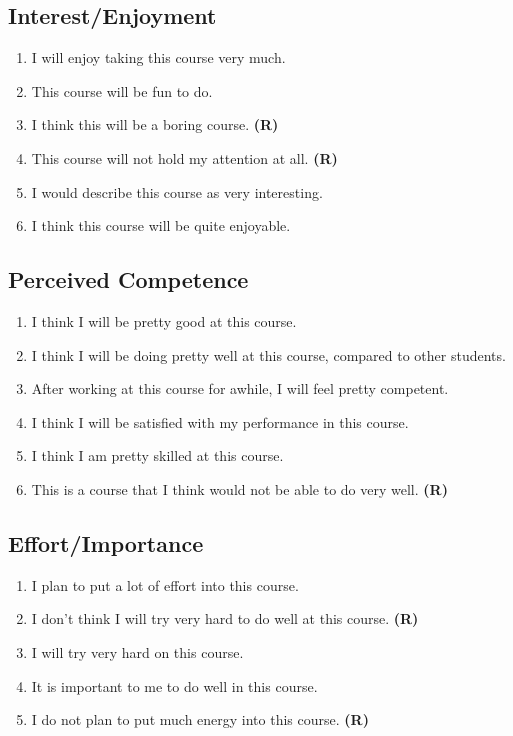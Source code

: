 \documentclass[letterpaper, nobind]{templates/ociamthesis}
\providecommand{\tightlist}{%
  \setlength{\itemsep}{0pt}\setlength{\parskip}{0pt}}
\begin{document}
\hypertarget{interestenjoyment}{%
\subsection{Interest/Enjoyment}\label{interestenjoyment}}

\begin{enumerate}
\def\labelenumi{\arabic{enumi}.}
\tightlist
\item
  I will enjoy taking this course very much.
\item
  This course will be fun to do.
\item
  I think this will be a boring course. \textbf{(R)}
\item
  This course will not hold my attention at all. \textbf{(R)}
\item
  I would describe this course as very interesting.
\item
  I think this course will be quite enjoyable.
\end{enumerate}

\hypertarget{perceived-competence}{%
\subsection{Perceived Competence}\label{perceived-competence}}

\begin{enumerate}
\def\labelenumi{\arabic{enumi}.}
\tightlist
\item
  I think I will be pretty good at this course.
\item
  I think I will be doing pretty well at this course, compared to other students.
\item
  After working at this course for awhile, I will feel pretty competent.
\item
  I think I will be satisfied with my performance in this course.
\item
  I think I am pretty skilled at this course.
\item
  This is a course that I think would not be able to do very well. \textbf{(R)}
\end{enumerate}

\hypertarget{effortimportance}{%
\subsection{Effort/Importance}\label{effortimportance}}

\begin{enumerate}
\def\labelenumi{\arabic{enumi}.}
\tightlist
\item
  I plan to put a lot of effort into this course.
\item
  I don't think I will try very hard to do well at this course. \textbf{(R)}
\item
  I will try very hard on this course.
\item
  It is important to me to do well in this course.
\item
  I do not plan to put much energy into this course. \textbf{(R)}
\end{enumerate}
\end{document}

